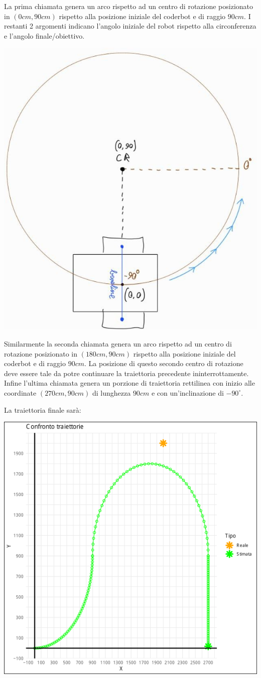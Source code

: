 \documentclass[11pt]{article}
\begin{document}
La prima chiamata genera un arco rispetto ad un centro di rotazione posizionato in \((0cm,90cm)\) rispetto alla posizione iniziale del coderbot e di raggio \(90cm\). I restanti 2 argomenti indicano l'angolo iniziale del robot rispetto alla circonferenza e l'angolo finale/obiettivo.

\begin{center}
\includegraphics[width=.9\linewidth]{./img/gen_arc_example.jpg}
\end{center}

Similarmente la seconda chiamata genera un arco rispetto ad un centro di rotazione posizionato in \((180cm,90cm)\) rispetto alla posizione iniziale del coderbot e di raggio \(90cm\). La posizione di questo secondo centro di rotazione deve essere tale da potre continuare la traiettoria precedente ininterrottamente.
Infine l'ultima chiamata genera un porzione di traiettoria rettilinea con inizio alle coordinate \((270cm, 90cm)\) di lunghezza \(90cm\) e con un'inclinazione di \(-90^\circ\).

La traiettoria finale sarà:
\begin{center}
\includegraphics[width=.9\linewidth]{./img/2025-07-09-114530_hyprshot.png}
\end{center}
\end{document}
